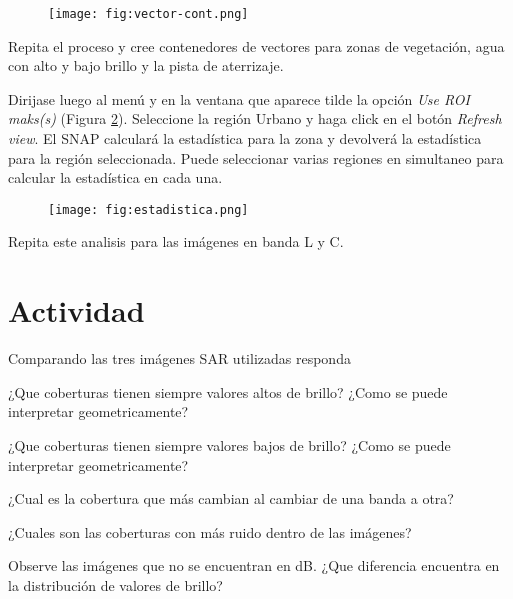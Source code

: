 \begin{figure}[h!]
    \centering
    \texttt{[image: fig:vector-cont.png]}
    \caption{}
    \label{fig:vector-cont}
\end{figure}

Repita el proceso y cree contenedores de vectores para zonas de vegetación, agua con alto y bajo brillo y la pista de aterrizaje.

Dirijase luego al menú  y en la ventana que aparece tilde la opción \emph{Use ROI maks(s)} (Figura \ref{fig:estadistica}). Seleccione la región Urbano y haga click en el botón \emph{Refresh view}. El SNAP calculará la estadística para la zona y devolverá la estadística para la región seleccionada. Puede seleccionar varias regiones en simultaneo para calcular la estadística en cada una.

\begin{figure}[h!]
    \centering
    \texttt{[image: fig:estadistica.png]}
    \caption{}
    \label{fig:estadistica}
\end{figure}

Repita este analisis para las imágenes en banda L y C.

\section{Actividad}

Comparando las tres imágenes SAR utilizadas responda

\begin{que}
    ¿Que coberturas tienen siempre valores altos de brillo? ¿Como se puede interpretar geometricamente?
\end{que}

\begin{que}
    ¿Que coberturas tienen siempre valores bajos de brillo? ¿Como se puede interpretar geometricamente?
\end{que}

\begin{que}
    ¿Cual es la cobertura que más cambian al cambiar de una banda a otra?
\end{que}

\begin{que}
    ¿Cuales son las coberturas con más ruido dentro de las imágenes?
\end{que}

\begin{que}
    Observe las imágenes que no se encuentran en dB. ¿Que diferencia encuentra en la distribución de valores de brillo?
\end{que}
